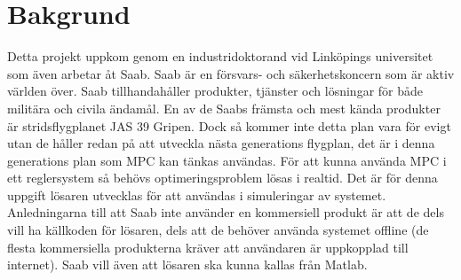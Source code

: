 \section{Bakgrund}    
Detta projekt uppkom genom en industridoktorand vid Linköpings universitet som även arbetar åt Saab. Saab är en försvars- och säkerhetskoncern som är aktiv världen över. Saab  tillhandahåller produkter, tjänster och lösningar för både militära och civila ändamål. \citep{saabbrief}
\newline
\newline
En av de Saabs främsta och mest kända produkter är stridsflygplanet JAS 39 Gripen. Dock så kommer inte detta plan vara för evigt utan de håller redan på att utveckla nästa generations flygplan, det är i denna generations plan som MPC kan tänkas användas. För att kunna använda MPC i ett reglersystem så behövs optimeringsproblem lösas i realtid. Det är för denna uppgift lösaren utvecklas för att användas i simuleringar av systemet. 
\newline
\newline
Anledningarna till att Saab inte använder en kommersiell produkt är att de dels vill ha källkoden för lösaren, dels att de behöver använda systemet offline (de flesta kommersiella produkterna kräver att användaren är uppkopplad till internet).  
\newline
\newline
Saab vill även att lösaren ska kunna kallas från Matlab. 
